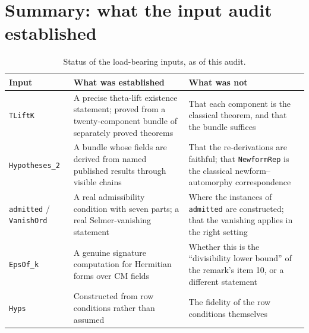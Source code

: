 \section{Summary: what the input audit established}\begin{table}[H]
\centering
\caption{Status of the load-bearing inputs, as of this audit.}
\label{tab:inputs}
\begin{tabular}{@{}>{\RaggedRight\arraybackslash\hyphenpenalty=10000\exhyphenpenalty=10000}p{}>{\RaggedRight\arraybackslash\hyphenpenalty=10000\exhyphenpenalty=10000}p{}>{\RaggedRight\arraybackslash\hyphenpenalty=10000\exhyphenpenalty=10000}p{}@{}}
\toprule
\textbf{Input} & \textbf{What was established} & \textbf{What was not} \\
\midrule
\texttt{TLiftK} & A precise theta-lift existence statement; proved from a
twenty-component bundle of separately proved theorems & That each component is
the classical theorem, and that the bundle suffices \\
\midrule
\texttt{Hypotheses\_2} & A bundle whose fields are derived from named
published results through visible chains & That the re-derivations are
faithful; that \texttt{NewformRep} is the classical newform--automorphy
correspondence \\
\midrule
\texttt{admitted} / \texttt{VanishOrd} & A real admissibility condition with
seven parts; a real Selmer-vanishing statement & Where the instances of
\texttt{admitted} are constructed; that the vanishing applies in the right
setting \\
\midrule
\texttt{EpsOf\_k} & A genuine signature computation for Hermitian forms over
CM fields & Whether this is the ``divisibility lower bound'' of the remark's
item 10, or a different statement \\
\midrule
\texttt{Hyps} & Constructed from row conditions rather than assumed & The
fidelity of the row conditions themselves \\
\bottomrule
\end{tabular}
\end{table}

